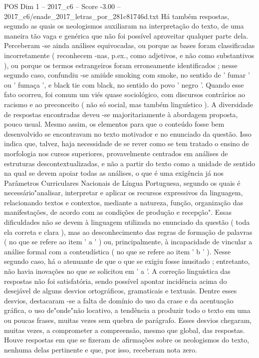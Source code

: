 \begin{textsample}{POS Dim 1 – 2017\_c6 – Score -3.00 – 2017\_c6/enade\_2017\_letras\_por\_281c81746d.txt}
Há também respostas, segundo as quais os neologismos auxiliaram na interpretação do texto, de uma maneira tão vaga e genérica que não foi possível aproveitar qualquer parte dela.
Perceberam -se ainda análises equivocadas, ou porque as bases foram classificadas incorretamente ( reconhecem -nas, p.ex., como adjetivos, e não como substantivos ), ou porque os termos estrangeiros foram erroneamente identificados ; nesse segundo caso, confundiu -se amiúde smoking com smoke, no sentido de ' fumar ' ou ' fumaça ', e black tie com black, no sentido do povo ' negro '.
Quando esse fato ocorreu, foi comum um viés quase sociológico, com discursos contrários ao racismo e ao preconceito ( não só social, mas também linguístico ).
A diversidade de respostas encontradas deveu -se majoritariamente à abordagem proposta, pouco usual.
Mesmo assim, os elementos para que o conteúdo fosse bem desenvolvido se encontravam no texto motivador e no enunciado da questão.
Isso indica que, talvez, haja necessidade de se rever como se tem tratado o ensino de morfologia nos cursos superiores, provavelmente centrados em análises de estruturas descontextualizadas, e não a partir do texto como a unidade de sentido na qual se devem apoiar todas as análises, o que é uma exigência já nos Parâmetros Curriculares Nacionais de Língua Portuguesa, segundo os quais é necessário"analisar, interpretar e aplicar os recursos expressivos da linguagem, relacionando textos e contextos, mediante a natureza, função, organização das manifestações, de acordo com as condições de produção e recepção".
Essas dificuldades não se devem à linguagem utilizada no enunciado da questão ( toda ela correta e clara ), mas ao desconhecimento das regras de formação de palavras ( no que se refere ao item ' a ' ) ou, principalmente, à incapacidade de vincular a análise formal com a conteudística ( no que se refere ao item ' b ' ).
Nesse segundo caso, há o atenuante de que o que se exigiu fosse inusitado ; entretanto, não havia inovações no que se solicitou em ' a '.
A correção linguística das respostas não foi satisfatória, sendo possível apontar incidência acima do desejável de alguns desvios ortográficos, gramaticais e textuais.
Dentre esses desvios, destacaram -se a falta de domínio do uso da crase e da acentuação gráfica, o uso de"onde"não locativo, a tendência a produzir todo o texto em uma ou poucas frases, muitas vezes sem quebra de parágrafo.
Esses desvios chegaram, muitas vezes, a comprometer a compreensão, mesmo que global, das respostas.
Houve respostas em que se fizeram de afirmações sobre os neologismos do texto, nenhuma delas pertinente e que, por isso, receberam nota zero.

\end{textsample}
